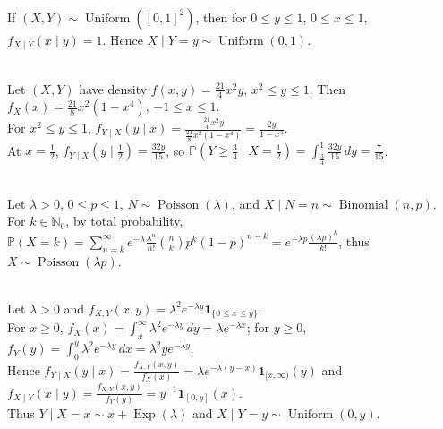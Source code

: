 \begin{example} \label{ex:conditional-density-uniform-square} \\
If $(X,Y)\sim\operatorname{Uniform}([0,1]^2)$, then for $0\leq y\leq1$, $0\leq x\leq1$, $f_{X\mid Y}(x\mid y)=1$. Hence $X\mid Y=y\sim\operatorname{Uniform}(0,1)$.
\end{example}

\begin{example} \label{ex:conditional-density-parabolic-region} \\
Let $(X,Y)$ have density $f(x,y)=\frac{21}{4}x^2y$, $x^2\leq y\leq1$. Then $f_X(x)=\frac{21}{8}x^2(1-x^4)$, $-1\leq x\leq1$.\\
For $x^2\leq y\leq1$, $f_{Y\mid X}(y\mid x)=\frac{\frac{21}{4}x^2y}{\frac{21}{8}x^2(1-x^4)}=\frac{2y}{1-x^4}$.\\
At $x=\frac{1}{2}$, $f_{Y\mid X}(y\mid\frac{1}{2})=\frac{32y}{15}$, so $\mathbb{P}(Y\geq\frac{3}{4}\mid X=\frac{1}{2})=\int_{\frac{3}{4}}^{1}\frac{32y}{15}\,dy=\frac{7}{15}$.
\end{example}

\begin{example} \label{ex:poisson-thinning-by-total-probability} \\
Let $\lambda>0$, $0\leq p\leq1$, $N\sim\operatorname{Poisson}(\lambda)$, and $X\mid N=n\sim\operatorname{Binomial}(n,p)$.\\
For $k\in\mathbb{N}_0$, by total probability, $\mathbb{P}(X=k)=\sum\limits_{n=k}^{\infty}e^{-\lambda}\frac{\lambda^n}{n!}\binom{n}{k}p^k(1-p)^{n-k}=e^{-\lambda p}\frac{(\lambda p)^k}{k!}$, thus $X\sim\operatorname{Poisson}(\lambda p)$.
\end{example}

\begin{example} \label{ex:triangular-exponential-conditional-density} \\
Let $\lambda>0$ and $f_{X,Y}(x,y)=\lambda^2e^{-\lambda y}\mathbf{1}_{\{0\leq x\leq y\}}$.\\
For $x\geq0$, $f_X(x)=\int_x^\infty\lambda^2e^{-\lambda y}\,dy=\lambda e^{-\lambda x}$; for $y\geq0$, $f_Y(y)=\int_0^y\lambda^2e^{-\lambda y}\,dx=\lambda^2ye^{-\lambda y}$.\\
Hence $f_{Y\mid X}(y\mid x)=\frac{f_{X,Y}(x,y)}{f_X(x)}=\lambda e^{-\lambda(y-x)}\mathbf{1}_{[x,\infty)}(y)$ and $f_{X\mid Y}(x\mid y)=\frac{f_{X,Y}(x,y)}{f_Y(y)}=y^{-1}\mathbf{1}_{[0,y]}(x)$.\\
Thus $Y\mid X=x\sim x+\operatorname{Exp}(\lambda)$ and $X\mid Y=y\sim\operatorname{Uniform}(0,y)$.
\end{example}

